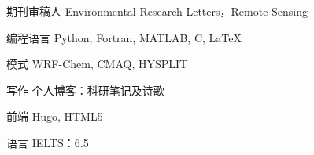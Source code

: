 
\begin{cvskills}

  \cvskill
    {期刊审稿人} %
    {Environmental Research Letters，Remote Sensing} %

  \cvskill
    {编程语言} %
    {Python, Fortran, MATLAB, C, \LaTeX} %

  \cvskill
    {模式} %
    {WRF-Chem, CMAQ, HYSPLIT} %

  \cvskill
    {写作} %
    {个人博客：科研笔记及诗歌} %

  \cvskill
    {前端} %
    {Hugo, HTML5} %

  \cvskill
    {语言} %
    {IELTS：6.5} %

\end{cvskills}
